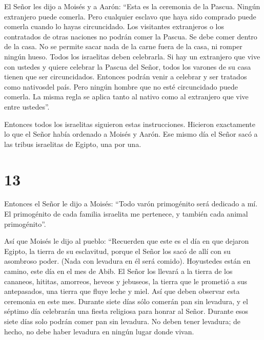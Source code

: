  El Señor les dijo a Moisés y a Aarón: ``Esta es la
ceremonia de la Pascua. Ningún extranjero puede comerla. 
Pero cualquier esclavo que haya sido comprado puede comerla cuando lo
hayas circuncidado.  Los visitantes extranjeros o los
contratados de otras naciones no podrán comer la Pascua. 
Se debe comer dentro de la casa. No se permite sacar nada de la carne
fuera de la casa, ni romper ningún hueso.  Todos los
israelitas deben celebrarla.  Si hay un extranjero que vive
con ustedes y quiere celebrar la Pascua del Señor, todos los varones de
su casa tienen que ser circuncidados. Entonces podrán venir a celebrar y
ser tratados como nativosdel país. Pero ningún hombre que no esté
circuncidado puede comerla.  La misma regla se aplica tanto
al nativo como al extranjero que vive entre ustedes''.

 Entonces todos los israelitas siguieron estas
instrucciones. Hicieron exactamente lo que el Señor había ordenado a
Moisés y Aarón.  Ese mismo día el Señor sacó a las tribus
israelitas de Egipto, una por una.

\hypertarget{section-12}{%
\section{13}\label{section-12}}

 Entonces el Señor le dijo a Moisés:  ``Todo
varón primogénito será dedicado a mí. El primogénito de cada familia
israelita me pertenece, y también cada animal primogénito''.

 Así que Moisés le dijo al pueblo: ``Recuerden que este es
el día en que dejaron Egipto, la tierra de su esclavitud, porque el
Señor los sacó de allí con su asombroso poder. (Nada con levadura en él
será comido).  Hoyustedes están en camino, este día en el
mes de Abib.  El Señor los llevará a la tierra de los
cananeos, hititas, amorreos, heveos y jebuseos, la tierra que le
prometió a sus antepasados, una tierra que fluye leche y miel. Así que
deben observar esta ceremonia en este mes.  Durante siete
días sólo comerán pan sin levadura, y el séptimo día celebrarán una
fiesta religiosa para honrar al Señor.  Durante esos siete
días solo podrán comer pan sin levadura. No deben tener levadura; de
hecho, no debe haber levadura en ningún lugar donde vivan.

